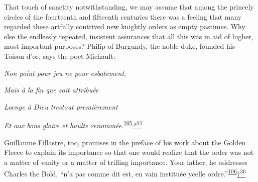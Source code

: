 That touch of sanctity notwithstanding, we may assume that among the
princely circles of the fourteenth and fifteenth centuries there was a
feeling that many regarded these artfully contrived new
\protect\hypertarget{10_Chapter_Three__THE_HEROIC_DREAM.xhtmlux5cux23page_94}{}{}knightly
orders as empty pastimes. Why else the endlessly repeated, insistent
assurances that all this was in aid of higher, most important purposes?
Philip of Burgundy, the noble duke, founded his Toison d'or, says the
poet Michault:

\emph{Non point pour jeu ne pour esbatement},

\emph{Mais à la fin que soit attribuée}

\emph{Loenge à Dieu trestout premièrement}

\emph{Et aux bons gloire et haulte
renommée}.\textsuperscript{\protect\hypertarget{10_Chapter_Three__THE_HEROIC_DREAM.xhtmlux5cux23id_1725}{\protect\hyperlink{23_NOTES.xhtmlux5cux23id_1726}{105}}}\emph{\protect\hypertarget{10_Chapter_Three__THE_HEROIC_DREAM.xhtmlux5cux23id_2531}{\protect\hyperlink{23_NOTES.xhtmlux5cux23id_2532}{*\textsuperscript{35}}}}

Guillaume Fillastre, too, promises in the preface of his work about the
Golden Fleece to explain its importance so that one would realize that
the order was not a matter of vanity or a matter of trifling importance.
Your father, he addresses Charles the Bold, ``n'a pas comme dit est, en
vain instituée ycelle
ordre.''\textsuperscript{\protect\hypertarget{10_Chapter_Three__THE_HEROIC_DREAM.xhtmlux5cux23id_1723}{\protect\hyperlink{23_NOTES.xhtmlux5cux23id_1724}{106}}}\protect\hypertarget{10_Chapter_Three__THE_HEROIC_DREAM.xhtmlux5cux23id_2533}{\protect\hyperlink{23_NOTES.xhtmlux5cux23id_2534}{†\textsuperscript{36}}}


